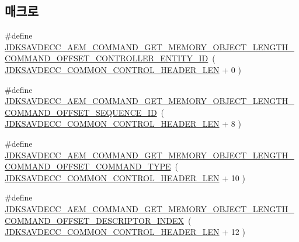 \subsection*{매크로}
\begin{DoxyCompactItemize}
\item 
\#define \hyperlink{group__command__get__memory__object__length_gabc1f55834c86c5a4e18384d9361c2d06}{J\+D\+K\+S\+A\+V\+D\+E\+C\+C\+\_\+\+A\+E\+M\+\_\+\+C\+O\+M\+M\+A\+N\+D\+\_\+\+G\+E\+T\+\_\+\+M\+E\+M\+O\+R\+Y\+\_\+\+O\+B\+J\+E\+C\+T\+\_\+\+L\+E\+N\+G\+T\+H\+\_\+\+C\+O\+M\+M\+A\+N\+D\+\_\+\+O\+F\+F\+S\+E\+T\+\_\+\+C\+O\+N\+T\+R\+O\+L\+L\+E\+R\+\_\+\+E\+N\+T\+I\+T\+Y\+\_\+\+ID}~( \hyperlink{group__jdksavdecc__avtp__common__control__header_gaae84052886fb1bb42f3bc5f85b741dff}{J\+D\+K\+S\+A\+V\+D\+E\+C\+C\+\_\+\+C\+O\+M\+M\+O\+N\+\_\+\+C\+O\+N\+T\+R\+O\+L\+\_\+\+H\+E\+A\+D\+E\+R\+\_\+\+L\+EN} + 0 )
\item 
\#define \hyperlink{group__command__get__memory__object__length_gafe050f07f7b965dc2606f7140b97c0fd}{J\+D\+K\+S\+A\+V\+D\+E\+C\+C\+\_\+\+A\+E\+M\+\_\+\+C\+O\+M\+M\+A\+N\+D\+\_\+\+G\+E\+T\+\_\+\+M\+E\+M\+O\+R\+Y\+\_\+\+O\+B\+J\+E\+C\+T\+\_\+\+L\+E\+N\+G\+T\+H\+\_\+\+C\+O\+M\+M\+A\+N\+D\+\_\+\+O\+F\+F\+S\+E\+T\+\_\+\+S\+E\+Q\+U\+E\+N\+C\+E\+\_\+\+ID}~( \hyperlink{group__jdksavdecc__avtp__common__control__header_gaae84052886fb1bb42f3bc5f85b741dff}{J\+D\+K\+S\+A\+V\+D\+E\+C\+C\+\_\+\+C\+O\+M\+M\+O\+N\+\_\+\+C\+O\+N\+T\+R\+O\+L\+\_\+\+H\+E\+A\+D\+E\+R\+\_\+\+L\+EN} + 8 )
\item 
\#define \hyperlink{group__command__get__memory__object__length_ga5c1b9fdd7e368b686a3af8c519adcb4f}{J\+D\+K\+S\+A\+V\+D\+E\+C\+C\+\_\+\+A\+E\+M\+\_\+\+C\+O\+M\+M\+A\+N\+D\+\_\+\+G\+E\+T\+\_\+\+M\+E\+M\+O\+R\+Y\+\_\+\+O\+B\+J\+E\+C\+T\+\_\+\+L\+E\+N\+G\+T\+H\+\_\+\+C\+O\+M\+M\+A\+N\+D\+\_\+\+O\+F\+F\+S\+E\+T\+\_\+\+C\+O\+M\+M\+A\+N\+D\+\_\+\+T\+Y\+PE}~( \hyperlink{group__jdksavdecc__avtp__common__control__header_gaae84052886fb1bb42f3bc5f85b741dff}{J\+D\+K\+S\+A\+V\+D\+E\+C\+C\+\_\+\+C\+O\+M\+M\+O\+N\+\_\+\+C\+O\+N\+T\+R\+O\+L\+\_\+\+H\+E\+A\+D\+E\+R\+\_\+\+L\+EN} + 10 )
\item 
\#define \hyperlink{group__command__get__memory__object__length_gaef3672ace9ef9c1ddf37bfacdd009df0}{J\+D\+K\+S\+A\+V\+D\+E\+C\+C\+\_\+\+A\+E\+M\+\_\+\+C\+O\+M\+M\+A\+N\+D\+\_\+\+G\+E\+T\+\_\+\+M\+E\+M\+O\+R\+Y\+\_\+\+O\+B\+J\+E\+C\+T\+\_\+\+L\+E\+N\+G\+T\+H\+\_\+\+C\+O\+M\+M\+A\+N\+D\+\_\+\+O\+F\+F\+S\+E\+T\+\_\+\+D\+E\+S\+C\+R\+I\+P\+T\+O\+R\+\_\+\+I\+N\+D\+EX}~( \hyperlink{group__jdksavdecc__avtp__common__control__header_gaae84052886fb1bb42f3bc5f85b741dff}{J\+D\+K\+S\+A\+V\+D\+E\+C\+C\+\_\+\+C\+O\+M\+M\+O\+N\+\_\+\+C\+O\+N\+T\+R\+O\+L\+\_\+\+H\+E\+A\+D\+E\+R\+\_\+\+L\+EN} + 12 )

\end{DoxyCompactItemize}
